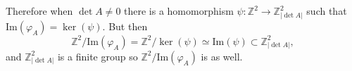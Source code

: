 \documentclass{article}
\begin{document}
\begin{Answer}
\begin{enumerate}[(a)]
{    Therefore when $\det A \neq 0$ there is a homomorphism
    $\psi : \mathbb{Z}^2 \to \mathbb{Z}_{|\det A|}^2$ such that
    $\mathrm{Im}(\varphi_A) = \ker(\psi)$. But then
    $$
    \mathbb{Z}^2 / \mathrm{Im}(\varphi_A) =
    \mathbb{Z}^2 / \ker(\psi) \simeq
    \mathrm{Im}(\psi) \subset \mathbb{Z}_{|\det A|}^2,
    $$
    and $\mathbb{Z}_{|\det A|}^2$ is a finite group so
    $\mathbb{Z}^2 / \mathrm{Im}(\varphi_A)$ is as well.

%
}
\end{enumerate}
\end{Answer}
\end{document}
